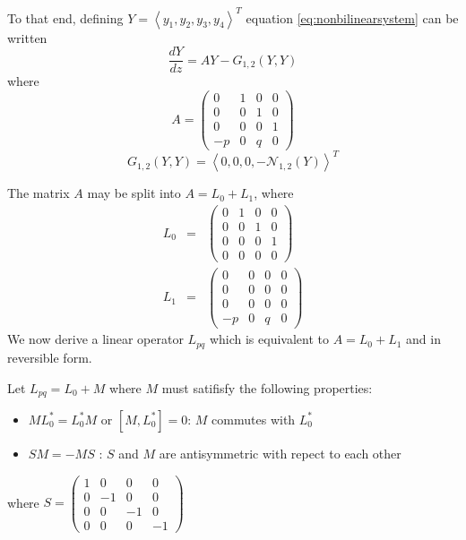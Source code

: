 To that end, defining  $Y=\left<y_1,y_2,y_3,y_4\right>^T$ equation 
\eqref{eq:nonbilinearsystem} can be written
\begin{equation}\label{eq:matrixeq1}
 \frac{ dY }{ dz } = A Y - G_{1,2}(Y,Y)
\end{equation}
where 
\begin{equation}\label{eq:nonlinear}
A = \left(\begin{array}{cccc}0&1&0&0\\0&0&1&0\\0&0&0&1\\-p&0&q&0\end{array}\right) 
\end{equation}
\begin{equation}\label{eq:nonlinear}
G_{1,2}(Y,Y) = \left<0,0,0,-\mathcal{N}_{1,2}\left(Y\right)\right>^T
\end{equation}

The matrix $A$ may be split into $A = L_0 + L_1 $, where 
\begin{subequations}
\begin{eqnarray}
L_0 &=& \left(\begin{array}{cccc}0&1&0&0\\0&0&1&0\\0&0&0&1\\0&0&0&0\end{array}\right) \\
L_1 &=& \left(\begin{array}{cccc}0&0&0&0\\0&0&0&0\\0&0&0&0\\-p&0&q&0\end{array}\right) 
\end{eqnarray}
\end{subequations}
We now derive a linear operator $L_{pq}$ which is equivalent to $A=L_0+L_1$ and in reversible form.

Let $L_{pq} = L_0 + M $ where $M$ must satifisfy the following properties:

\begin{itemize}
\item $ M L_0^* = L_0^* M $ or $ \left[M, L_0^*\right]=0$: $M$ commutes with $L_0^*$
\item $ S M  = -M S $ : $S$ and $M$ are antisymmetric with repect to each other
\end{itemize}
where $S = \left(\begin{array}{cccc}1&0&0&0\\0&-1&0&0\\0&0&-1&0\\0&0&0&-1\end{array}\right) $


